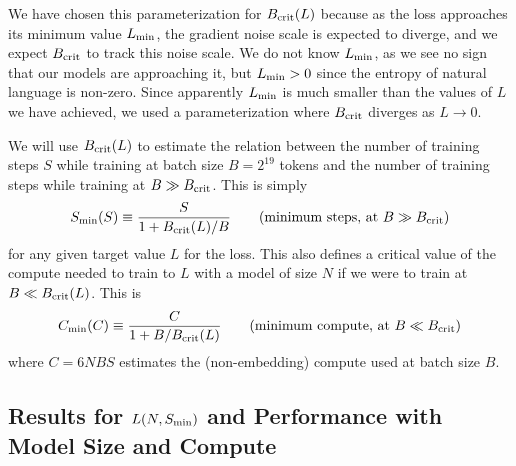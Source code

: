 \documentclass[english]{article}
\newcommand{\be}{\begin{equation}}
\newcommand{\ee}{\end{equation}}
\begin{document}
We have chosen this parameterization for $B_{\rm crit}(L)$ because as the loss approaches its minimum value $L_{\rm min}$, the gradient noise scale is expected to diverge, and we expect $B_{\rm crit}$ to track this noise scale.  We do not know $L_{\rm min}$, as we see no sign that our models are approaching it, but $L_{\rm min} > 0$ since the entropy of natural language is non-zero.  Since apparently $L_{\rm min}$ is much smaller than the values of $L$ we have achieved, we used a parameterization where $B_{\rm crit}$ diverges as $L \to 0$. 

We will use $B_{\rm crit}(L)$ to estimate the relation between the number of training steps $S$ while training at batch size $B = 2^{19}$ tokens and the number of training steps while training at $B \gg B_{\rm crit}$.  This is simply
\be
\label{eq:AdjustedSteps}
S_{\rm min}(S) \equiv \frac{S}{1 + B_{\rm crit}(L)/B} \qquad (\text{minimum steps, at } B \gg B_{\rm crit})
\ee
for any given target value $L$ for the loss.  This also defines a critical value of the compute needed to train to $L$ with a model of size $N$ if we were to train at $B \ll B_{\rm crit}(L)$. This is
\be
\label{eq:AdjustedCompute}
C_{\rm min}(C) \equiv \frac{C  }{1 + B/B_{\rm crit}(L) } \qquad (\text{minimum compute, at } B \ll B_{\rm crit})
\ee
where $C = 6 N BS$ estimates the (non-embedding) compute used at batch size $B$.



\subsection{Results for $L(N, S_{\rm min})$ and Performance with Model Size and Compute}
\end{document}
